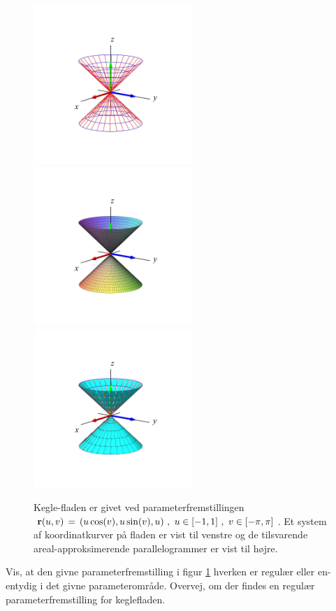 \begin{figure}[h]
\centerline{\includegraphics[height=60mm]{FIGS/plotKegle1}\includegraphics[height=60mm]{FIGS/plotKegle2}\includegraphics[height=60mm]{FIGS/plotKegle3} }
\begin{center}
\caption{\small{Kegle-fladen er givet ved
parameterfremstillingen ${\bf r}(u, v) \, = \,
(u\cos(v), u\sin(v), u) \,\,, \,\, u \in [-1, 1
]\,\, , \, \, v \in [-\pi, \pi]$. Et system af
koordinatkurver på fladen er vist til venstre og
de tilsvarende areal-approksimerende
parallelogrammer er vist til højre.}} \label{figKegle12}
\end{center}
\end{figure}


\begin{exercise}
Vis, at den givne parameterfremstilling i figur \ref{figKegle12}
hverken er regulær eller en-entydig i det givne parameterområde. Overvej, om der findes en
regulær parameterfremstilling for keglefladen.
\end{exercise}

